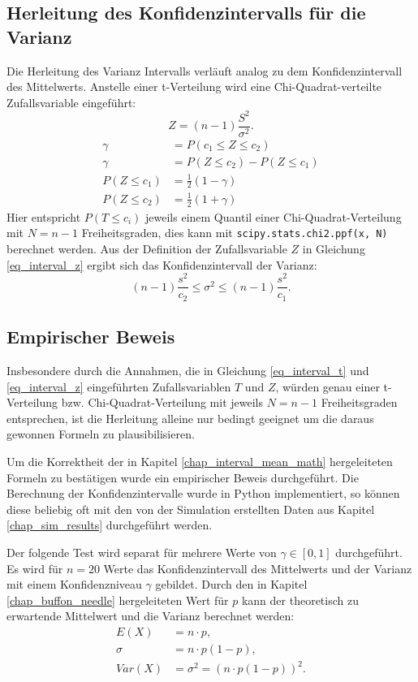 \documentclass[10pt,twocolumn]{scrartcl}
\begin{document}
	\subsection{Herleitung des Konfidenzintervalls für die Varianz}
		\label{chap_interval_var_math}
		Die Herleitung des Varianz Intervalls verläuft analog zu dem Konfidenzintervall  des Mittelwerts. Anstelle einer t-Verteilung wird eine Chi-Quadrat-verteilte Zufallsvariable eingeführt:
		\begin{equation} \label{eq_interval_z}
		Z = (n-1)\frac{S^2}{\sigma^2} .
		\end{equation}
		\begin{align}
		\gamma &= P(c_1 \le Z \le c_2) \\
		\gamma &= P(Z \le c_2) - P(Z \le c_1) \nonumber \\
		P(Z \le c_1) &= \frac{1}{2} (1-\gamma) \\
		P(Z \le c_2) &= \frac{1}{2} (1+\gamma)
		\end{align}
		Hier entspricht $P(T \le c_i)$ jeweils einem Quantil einer Chi-Quadrat-Verteilung mit $N = n-1$ Freiheitsgraden, dies kann mit \texttt{scipy.stats.chi2.ppf(x, N)}\cite{scipy} berechnet werden.
		Aus der Definition der Zufallsvariable $Z$ in Gleichung \ref{eq_interval_z} ergibt sich das Konfidenzintervall der Varianz:
		\begin{equation}
		(n-1)  \frac{s^2}{c_2} \le \sigma^2 \le (n-1)  \frac{s^2}{c_1}.
		\end{equation}

	\subsection{Empirischer Beweis}
		\label{chap_interval_prove}
		Insbesondere durch die Annahmen, die in Gleichung \ref{eq_interval_t} und \ref{eq_interval_z} eingeführten  Zufallsvariablen $T$ und $Z$, würden genau einer t-Verteilung bzw. Chi-Quadrat-Verteilung mit jeweils $N = n-1$ Freiheitsgraden entsprechen, ist die Herleitung alleine nur bedingt geeignet um die daraus gewonnen Formeln zu plausibilisieren.

		Um die Korrektheit der in Kapitel \ref{chap_interval_mean_math} hergeleiteten Formeln zu bestätigen wurde ein empirischer Beweis durchgeführt. Die Berechnung der Konfidenzintervalle wurde in Python implementiert, so können diese beliebig oft mit den von der Simulation erstellten Daten aus Kapitel \ref{chap_sim_results} durchgeführt werden.

		Der folgende Test wird separat für mehrere Werte von $\gamma \in [0, 1]$ durchgeführt. Es wird für $n = 20$ Werte das Konfidenzintervall des Mittelwerts und der Varianz mit einem Konfidenzniveau $\gamma$ gebildet. Durch den in Kapitel \ref{chap_buffon_needle} hergeleiteten Wert für $p$ kann der theoretisch zu erwartende Mittelwert und die Varianz berechnet werden:
		\begin{align}
		E(X) &= n \cdot p , \\
		\sigma &= n \cdot p (1-p) , \nonumber \\
		Var(X) &= \sigma^2 = (n \cdot p (1-p))^2 .
		\end{align}
\end{document}
